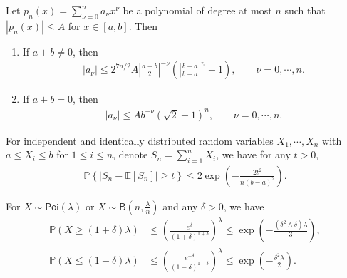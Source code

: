 \documentclass[final,12pt]{colt2018} %
\def \bP {\mathbb{P}}
\def \bE {\mathbb{E}}
\begin{document}
\begin{lemma}\cite[Lemma 28]{Han--Jiao--Weissman2016minimaxdivergence}\label{lem.polycoeff}
	Let $p_n(x) = \sum_{\nu=0}^n a_\nu x^\nu$ be a polynomial of degree at most $n$ such that $|p_n(x)|\leq A$ for $x\in [a,b]$. Then
	\begin{enumerate}
		\item If $a+b\neq 0$, then
		\begin{align*}
		|a_\nu| \le 2^{7n/2}A\left|\frac{a+b}{2}\right|^{-\nu}\left(\left|\frac{b+a}{b-a}\right|^n +1 \right), \qquad \nu=0,\cdots,n.
		\end{align*}
		\item If $a+b = 0$, then
		\begin{align*}
		|a_\nu| \leq A b^{-\nu} (\sqrt{2}+1)^n, \qquad \nu=0,\cdots,n.
		\end{align*}
	\end{enumerate}
\end{lemma}

\begin{lemma}\label{lem_hoeffding}
	\cite{Hoeffding1963probability} For independent and identically distributed random variables $X_1,\cdots,X_n$ with $a\le X_i\le b$ for $1\le i\le n$, denote $S_n=\sum_{i=1}^n X_i$, we have for any $t>0$,
	\begin{align*}
	\bP\left\{|S_n-\bE[S_n]|\ge t\right\} \le 2\exp\left(-\frac{2t^2}{n(b-a)^2}\right).
	\end{align*}
\end{lemma}

\begin{lemma}\label{lemma.poissontail}
	\cite[Theorem 5.4]{mitzenmacher2005probability}
	For $X\sim \mathsf{Poi}(\lambda)$ or $X\sim \mathsf{B}(n,\frac{\lambda}{n})$ and any $\delta>0$, we have
	\begin{align*}
	\mathbb{P}(X\ge (1+\delta)\lambda) &\le \left(\frac{e^\delta}{(1+\delta)^{1+\delta}}\right)^\lambda \le \exp(-\frac{(\delta^2\wedge \delta)\lambda}{3}),\\
	\mathbb{P}(X\le (1-\delta)\lambda) &\le \left(\frac{e^{-\delta}}{(1-\delta)^{1-\delta}}\right)^\lambda \le \exp(-\frac{\delta^2\lambda}{2}).
	\end{align*}
\end{lemma}

\end{document}
